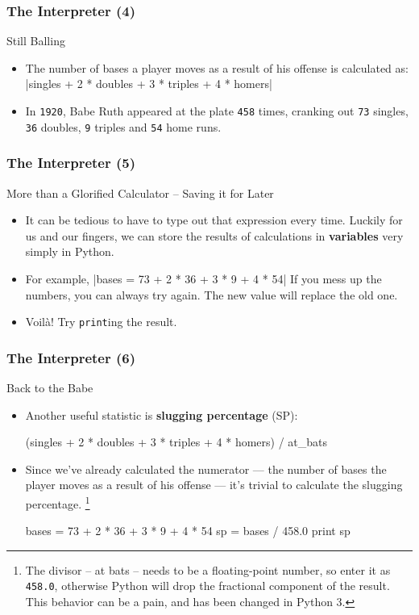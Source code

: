 \documentclass[10pt]{beamer}
\begin{document}
\begin{frame}[fragile]
  \frametitle{The Interpreter (4)}
  \begin{block}{Still Balling}
    \begin{itemize}
      \item The number of bases a player moves as a result of his offense is calculated as:  
      |singles + 2 * doubles + 3 * triples + 4 * homers|
      \item In \texttt{1920}, Babe Ruth appeared at the plate \texttt{458} times, cranking out \texttt{73} singles, \texttt{36} doubles, \texttt{9} triples and \texttt{54} home runs.    
    \end{itemize}
  \end{block}
\end{frame}

\begin{frame}
  \frametitle{The Interpreter (5)}
  \begin{block}{More than a Glorified Calculator -- Saving it for Later}
    \begin{itemize}
      \item It can be tedious to have to type out that expression every time.
        Luckily for us and our fingers, we can store the results of calculations in \textbf{variables} very simply in Python.
      \item For example, |bases = 73 + 2 * 36 + 3 * 9 + 4 * 54|
        If you mess up the numbers, you can always try again.
        The new value will replace the old one.
      \item Voil\`{a}! Try \texttt{print}ing the result.
    \end{itemize}
  \end{block}
\end{frame}


\begin{frame}[fragile]
  \frametitle{The Interpreter (6)}
  \begin{block}{Back to the Babe}
    \begin{itemize}
      \item Another useful statistic is \textbf{slugging percentage} (SP):    
      \footnotesize
      \begin{pythoncode}
  (singles + 2 * doubles + 3 * triples + 4 * homers) / at_bats
      \end{pythoncode}
      \normalsize
      \item Since we've already calculated the numerator --- the number of bases the player moves as a result of his offense --- it's trivial to calculate the slugging percentage.
      \footnote{The divisor -- at bats -- needs to be a floating-point number, so enter it as \texttt{458.0}, otherwise Python will drop the fractional component of the result.  This behavior can be a pain, and has been changed in Python 3.}
      \begin{pythoncode}
  bases = 73 + 2 * 36 + 3 * 9 + 4 * 54
  sp = bases / 458.0
  print sp
      \end{pythoncode}
    \end{itemize}
  \end{block}
\end{frame}
\end{document}
